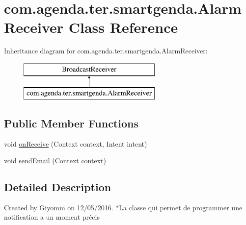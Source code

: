 \hypertarget{classcom_1_1agenda_1_1ter_1_1smartgenda_1_1_alarm_receiver}{\section{com.\-agenda.\-ter.\-smartgenda.\-Alarm\-Receiver Class Reference}
\label{classcom_1_1agenda_1_1ter_1_1smartgenda_1_1_alarm_receiver}
}
Inheritance diagram for com.\-agenda.\-ter.\-smartgenda.\-Alarm\-Receiver\-:\begin{figure}[H]
\begin{center}
\leavevmode
\includegraphics[height=2.000000cm]{classcom_1_1agenda_1_1ter_1_1smartgenda_1_1_alarm_receiver}
\end{center}
\end{figure}
\subsection*{Public Member Functions}
\begin{DoxyCompactItemize}
\item 
void \hyperlink{classcom_1_1agenda_1_1ter_1_1smartgenda_1_1_alarm_receiver_a51537f75f37fde6f1e65cd65c6920578}{on\-Receive} (Context context, Intent intent)
\item 
void \hyperlink{classcom_1_1agenda_1_1ter_1_1smartgenda_1_1_alarm_receiver_af2e41ce5f97a06eb8942c60e2d5347e0}{send\-Email} (Context context)
\end{DoxyCompactItemize}


\subsection{Detailed Description}
Created by Giyomm on 12/05/2016. $\ast$\-La classe qui permet de programmer une notification a un moment précis 

